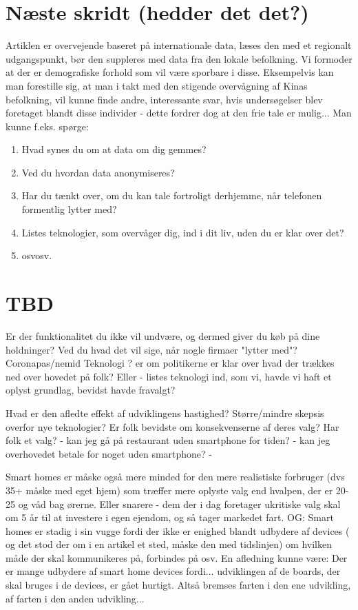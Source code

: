 \documentclass{article}
\begin{document}
\section{Næste skridt (hedder det det?)}
Artiklen er overvejende baseret på internationale data, læses den med et regionalt udgangspunkt, bør den suppleres med data fra den lokale befolkning. Vi formoder at der er demografiske forhold som vil være sporbare i disse. Eksempelvis kan man forestille sig, at man i takt med den stigende overvågning af Kinas befolkning, vil kunne finde andre, interessante svar, hvis undersøgelser blev foretaget blandt disse individer - dette fordrer dog at den frie tale er mulig... 
Man kunne f.eks. spørge:
\begin{enumerate}
    \item Hvad synes du om at data om dig gemmes?
    \item Ved du hvordan data anonymiseres?
    \item Har du tænkt over, om du kan tale fortroligt derhjemme, når telefonen formentlig lytter med?
    \item Listes teknologier, som overvåger dig, ind i dit liv, uden du er klar over det?
    \item osvosv.    
\end{enumerate}
\newpage
\section{TBD}
Er der funktionalitet du ikke vil undvære, og dermed giver du køb på dine holdninger?
Ved du hvad det vil sige, når nogle firmaer "lytter med"?
Coronapas/nemid
Teknologi
? er om politikerne er klar over hvad der trækkes ned over hovedet på folk?
Eller - listes teknologi ind, som vi, havde vi haft et oplyst grundlag, bevidst havde fravalgt?


Hvad er den afledte effekt af udviklingens hastighed?
Større/mindre skepsis overfor nye teknologier?
Er folk bevidste om konsekvenserne af deres valg?
Har folk et valg? 
- kan jeg gå på restaurant uden smartphone for tiden?
- kan jeg overhovedet betale for noget uden smartphone?
- 

Smart homes er måske også mere minded for den mere realistiske forbruger (dvs 35+ måske med eget hjem) som træffer mere oplyste valg end hvalpen, der er 20-25 og våd bag ørerne.
Eller snarere - dem der i dag foretager ukritiske valg skal om 5 år til at investere i egen ejendom, og så tager markedet fart.
OG: Smart homes er stadig i sin vugge fordi der ikke er enighed blandt udbydere af devices ( og det stod der om i en artikel et sted, måske den med tidslinjen) om hvilken måde der skal kommunikeres på, forbindes på osv. En afledning kunne være: Der er mange udbydere af smart home devices fordi... udviklingen af de boards, der skal bruges i de devices, er gået hurtigt. Altså bremses farten i den ene udvikling, af farten i den anden udvikling...
\end{document}

